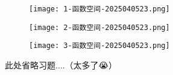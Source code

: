 \begin{figure}[H]
\centering
\texttt{[image: 1-函数空间-2025040523.png]}
\label{}
\end{figure}

\begin{figure}[H]
\centering
\texttt{[image: 2-函数空间-2025040523.png]}
\label{}
\end{figure}

\begin{figure}[H]
\centering
\texttt{[image: 3-函数空间-2025040523.png]}
\label{}
\end{figure}

此处省略习题....（太多了😭）

